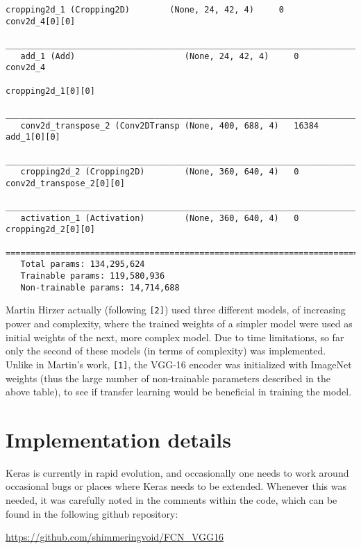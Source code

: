 \begin{Verbatim}[fontsize=\scriptsize]
   cropping2d_1 (Cropping2D)        (None, 24, 42, 4)     0           conv2d_4[0][0]                   
   _________________________________________________________________________________________
   add_1 (Add)                      (None, 24, 42, 4)     0           conv2d_4         
                                                                      cropping2d_1[0][0]               
   __________________________________________________________________________________________
   conv2d_transpose_2 (Conv2DTransp (None, 400, 688, 4)   16384       add_1[0][0]                      
   __________________________________________________________________________________________
   cropping2d_2 (Cropping2D)        (None, 360, 640, 4)   0           conv2d_transpose_2[0][0]         
   ____________________________________________________________________________________________
   activation_1 (Activation)        (None, 360, 640, 4)   0           cropping2d_2[0][0]               
   ============================================================================================
   Total params: 134,295,624
   Trainable params: 119,580,936
   Non-trainable params: 14,714,688

\end{Verbatim}


Martin Hirzer actually (following \verb|[2]|) used three different models, of increasing power and
complexity, where the trained weights of a simpler model were used as initial weights 
of the next, more complex model. Due to time limitations, so far only the second of 
these models (in terms of complexity) was implemented. Unlike in Martin's work, \verb|[1]|, 
the VGG-16 encoder was initialized with ImageNet weights (thus the large number of non-trainable
parameters described in the above table), to see if transfer learning 
would be beneficial in training the model.


\section{Implementation details}

Keras is currently in rapid evolution, and occasionally one needs to work around occasional
bugs or places where Keras needs to be extended. Whenever this was needed, it was carefully noted
in the comments within the code, which can be found in the following github repository: 
\smallskip

      \url{https://github.com/shimmeringvoid/FCN_VGG16}
      
